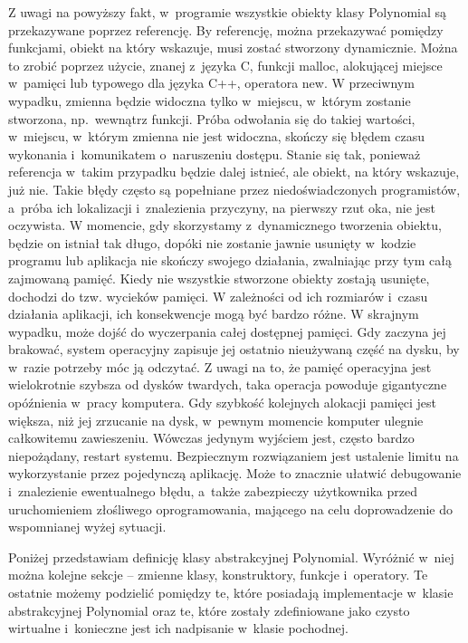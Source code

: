 Z uwagi na powyższy fakt, w~programie wszystkie obiekty klasy Polynomial są przekazywane poprzez referencję. By referencję, można przekazywać pomiędzy funkcjami, obiekt na który wskazuje, musi zostać stworzony dynamicznie. Można to zrobić poprzez użycie, znanej z~języka C, funkcji malloc, alokującej miejsce w~pamięci lub typowego dla języka C++, operatora new. W przeciwnym wypadku, zmienna będzie widoczna tylko w~miejscu, w~którym zostanie stworzona, np.\ wewnątrz funkcji. Próba odwołania się do takiej wartości, w~miejscu, w~którym zmienna nie jest widoczna, skończy się błędem czasu wykonania i~komunikatem o~naruszeniu dostępu. Stanie się tak, ponieważ referencja w~takim przypadku będzie dalej istnieć, ale obiekt, na który wskazuje, już nie. Takie błędy często są popełniane przez niedoświadczonych programistów, a~próba ich lokalizacji i~znalezienia przyczyny, na pierwszy rzut oka, nie jest oczywista. W momencie, gdy skorzystamy z~dynamicznego tworzenia obiektu, będzie on istniał tak długo, dopóki nie zostanie jawnie usunięty w~kodzie programu lub aplikacja nie skończy swojego działania, zwalniając przy tym całą zajmowaną pamięć. Kiedy nie wszystkie stworzone obiekty zostają usunięte, dochodzi do tzw. wycieków pamięci. W zależności od ich rozmiarów i~czasu działania aplikacji, ich konsekwencje mogą być bardzo różne. W skrajnym wypadku, może dojść do wyczerpania całej dostępnej pamięci. Gdy zaczyna jej brakować, system operacyjny zapisuje jej ostatnio nieużywaną część na dysku, by w~razie potrzeby móc ją odczytać. Z uwagi na to, że pamięć operacyjna jest wielokrotnie szybsza od dysków twardych, taka operacja powoduje gigantyczne opóźnienia w~pracy komputera. Gdy szybkość kolejnych alokacji pamięci jest większa, niż jej zrzucanie na dysk, w~pewnym momencie komputer ulegnie całkowitemu zawieszeniu. Wówczas jedynym wyjściem jest, często bardzo niepożądany, restart systemu. Bezpiecznym rozwiązaniem jest ustalenie limitu na wykorzystanie przez pojedynczą aplikację. Może to znacznie ułatwić debugowanie i~znalezienie ewentualnego błędu, a~także zabezpieczy użytkownika przed uruchomieniem złośliwego oprogramowania, mającego na celu doprowadzenie do wspomnianej wyżej sytuacji.

Poniżej przedstawiam definicję klasy abstrakcyjnej Polynomial. Wyróżnić w~niej można kolejne sekcje -- zmienne klasy, konstruktory, funkcje i~operatory. Te ostatnie możemy podzielić pomiędzy te, które posiadają implementacje w~klasie abstrakcyjnej Polynomial oraz te, które zostały zdefiniowane jako czysto wirtualne i~konieczne jest ich nadpisanie w~klasie pochodnej.

